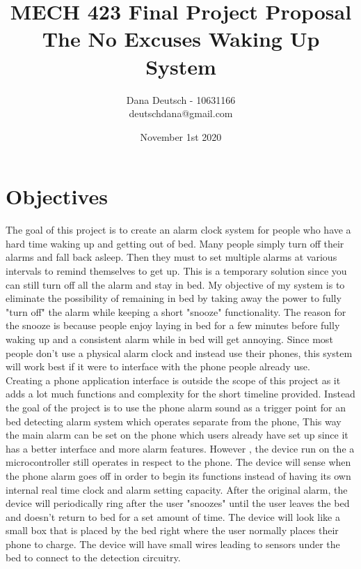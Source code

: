 \documentclass[11pt]{article}
\title{MECH 423 Final Project Proposal\\
		The No Excuses Waking Up System}
\author{Dana Deutsch - 10631166\\
		deutschdana@gmail.com}
\date{November 1st 2020}
\begin{document}
\maketitle
\newpage
\tableofcontents
\newpage

\section{Objectives}
The goal of this project is to create an alarm clock system for people who have a hard time waking up and getting out of bed.
Many people simply turn off their alarms and fall back asleep.
Then they must to set multiple alarms at various intervals to remind themselves to get up.
This is a temporary solution since you can still turn off all the alarm and stay in bed.
My objective of my system is to eliminate the possibility of remaining in bed by taking away the power to fully "turn off" the alarm while keeping a short "snooze" functionality. 
The reason for the snooze is because people enjoy laying in bed for a few minutes before fully waking up and a consistent alarm while in bed will get annoying. 
Since most people don't use a physical alarm clock and instead use their phones, this system will work best if it were to interface with the phone people already use.\\

Creating a phone application interface is outside the scope of this project as it adds a lot much functions and complexity for the short timeline provided. 
Instead the goal of the project is to use the phone alarm sound as a trigger point for an bed detecting alarm system which operates separate from the phone,
This way the main alarm can be set on the phone which users already have set up since it has a better interface and more alarm features.
However , the device run on the a microcontroller still operates in respect to the phone. 
The device will sense when the phone alarm goes off in order to begin its functions instead of having its own internal real time clock and alarm setting capacity.  
After the original alarm, the device will periodically ring after the user "snoozes" until the user leaves the bed and doesn't return to bed for a set amount of time. 
The device will look like a small box that is placed by the bed right where the user normally places their phone to charge.
The device will have small wires leading to sensors under the bed to connect to the detection circuitry.
\end{document}
